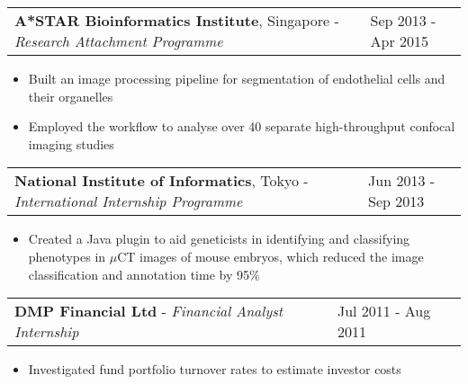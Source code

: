 \documentclass[11pt]{res}
\begin{document}
\vspace{-1.0em}
\begin{tabular}{@{} p{13.7cm} p{3.5cm} @{}} {\bf A*STAR Bioinformatics Institute}, Singapore - \emph{Research Attachment Programme} & Sep 2013 - Apr 2015 \end{tabular}
\begin{addmargin}[0em]{0em}
\vspace{-1.0em}
\textcolor{mygray}{
\begin{itemize} %
\item Built an image processing pipeline for segmentation of endothelial cells and their organelles
\item Employed the workflow to analyse over 40 separate high-throughput confocal imaging studies
\end{itemize}
}
\end{addmargin}
\vspace{-1.0em}
\begin{tabular}{@{} p{13.7cm} p{3.5cm} @{}} {\bf National Institute of Informatics}, Tokyo - \emph{International Internship Programme} & Jun 2013 - Sep 2013\end{tabular}
\begin{addmargin}[0em]{0em}
\vspace{-1.0em}
\textcolor{mygray}{
\begin{itemize} %
\item \textmd{Created a Java plugin to aid geneticists in identifying and classifying phenotypes in $\mu$CT images of mouse embryos, which reduced the image classification and annotation time by 95$\%$}
\end{itemize}
}
\end{addmargin}
\vspace{-1.0em}
\begin{tabular}{@{} p{13.7cm} p{3.5cm} @{}} {\bf DMP Financial Ltd} - \emph{Financial Analyst Internship} & Jul 2011 - Aug 2011 \end{tabular}
\vspace{-1.0em}
\textcolor{mygray}{
\begin{itemize} %
\item \textmd{Investigated fund portfolio turnover rates to estimate investor costs}
\end{itemize}
}
\end{document}
